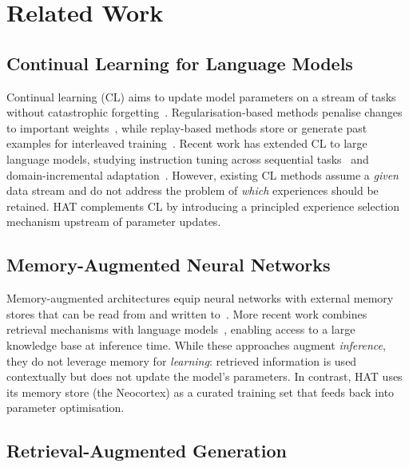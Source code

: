 \section{Related Work}
\label{sec:related_work}

\subsection{Continual Learning for Language Models}

Continual learning (CL) aims to update model parameters on a stream of tasks without catastrophic forgetting~\citep{kirkpatrick2017overcoming,zenke2017continual}.
Regularisation-based methods penalise changes to important weights~\citep{kirkpatrick2017overcoming,li2017learning}, while replay-based methods store or generate past examples for interleaved training~\citep{de2021continual,scialom2022fine}.
Recent work has extended CL to large language models, studying instruction tuning across sequential tasks~\citep{wu2024continual} and domain-incremental adaptation~\citep{ke2023continual}.
However, existing CL methods assume a \emph{given} data stream and do not address the problem of \emph{which} experiences should be retained.
HAT complements CL by introducing a principled experience selection mechanism upstream of parameter updates.

\subsection{Memory-Augmented Neural Networks}

Memory-augmented architectures equip neural networks with external memory stores that can be read from and written to~\citep{graves2014neural,sukhbaatar2015end}.
More recent work combines retrieval mechanisms with language models~\citep{borgeaud2022improving,zhong2022training}, enabling access to a large knowledge base at inference time.
While these approaches augment \emph{inference}, they do not leverage memory for \emph{learning}: retrieved information is used contextually but does not update the model's parameters.
In contrast, HAT uses its memory store (the Neocortex) as a curated training set that feeds back into parameter optimisation.

\subsection{Retrieval-Augmented Generation}


